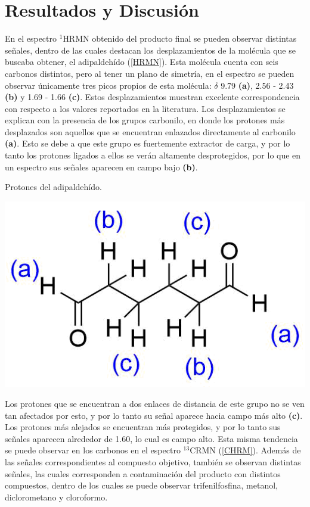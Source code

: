 \documentclass[fleqn,11pt]{SelfArx}
\begin{document}
\section{Resultados y Discusi\'on}
En el espectro $^1$HRMN obtenido del producto final se pueden observar distintas señales, dentro de las cuales destacan los desplazamientos de la molécula que se buscaba obtener, el adipaldehído (\autoref{HRMN}). Esta molécula cuenta con seis carbonos distintos, pero al tener un plano de simetría, en el espectro se pueden observar únicamente tres picos propios de esta molécula: $\delta$ 9.79 \textbf{(a)}, 2.56 - 2.43 \textbf{(b)} y 1.69 - 1.66 \textbf{(c)}. Estos desplazamientos muestran excelente correspondencia con respecto a los valores reportados en la literatura\cite{Miller2017}. Los desplazamientos se explican con la presencia de los grupos carbonilo, en donde los protones más desplazados son aquellos que se encuentran enlazados directamente al carbonilo \textbf{(a)}. Esto se debe a que este grupo es fuertemente extractor de carga, y por lo tanto los protones ligados a ellos se verán altamente desprotegidos, por lo que en un espectro sus señales aparecen en campo bajo \textbf{(b)}. 
\begin{scheme}[h]
	\centering
	\caption{Protones del adipaldeh\'ido.}
	\includegraphics[width=0.5\linewidth]{structures/hidrogenos.png}
\end{scheme}

Los protones que se encuentran a dos enlaces de distancia de este grupo no se ven tan afectados por esto, y por lo tanto su señal aparece hacia campo más alto \textbf{(c)}. Los protones más alejados se encuentran más protegidos, y por lo tanto sus señales aparecen alrededor de 1.60, lo cual es campo alto. Esta misma tendencia se puede observar en los carbonos en el espectro $^{13}$CRMN (\autoref{CHRM}). Además de las señales correspondientes al compuesto objetivo, también se observan distintas señales, las cuales corresponden a contaminación del producto con distintos compuestos, dentro de los cuales se puede observar trifenilfosfina, metanol, diclorometano y cloroformo.
\end{document}
